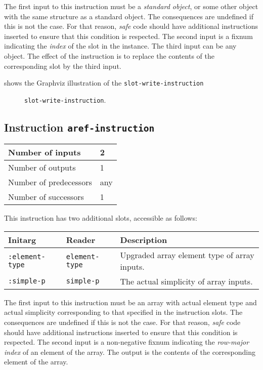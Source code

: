 The first input to this instruction must be a \emph{standard object},
or some other object with the same structure as a standard object.
The consequences are undefined if this is not the case.  For that
reason, \emph{safe} code should have additional instructions inserted
to ensure that this condition is respected.  The second input is a
fixnum indicating the \emph{index} of the slot in the instance.  The
third input can be any object.  The effect of the instruction is to
replace the contents of the corresponding slot by the third input.

 shows the Graphviz illustration of the
\texttt{slot-write-instruction}

\begin{figure}
\begin{center}
\end{center}
\caption{\label{fig-slot-write-instruction}
\texttt{slot-write-instruction}.}
\end{figure}

\subsection{Instruction \texttt{aref-instruction}}
\label{mir-instruction-aref}

\begin{tabular}{|l|l|}
\hline
Number of inputs & 2\\
\hline
Number of outputs & 1\\
\hline
Number of predecessors & any\\
\hline
Number of successors & 1\\
\hline
\end{tabular}

This instruction has two additional slots, accessible as follows:

\begin{tabular}{|l|l|l|}
  \hline
  Initarg & Reader & Description\\
  \hline\hline
  \texttt{:element-type} & \texttt{element-type} & Upgraded array element type of array inputs.\\
  \hline
  \texttt{:simple-p} & \texttt{simple-p} & The actual simplicity of array inputs.\\
  \hline
\end{tabular}

The first input to this instruction must be an array with actual
element type and actual simplicity corresponding to that specified in
the instruction slots. The consequences are undefined if this is not
the case.  For that reason, \emph{safe} code should have additional
instructions inserted to ensure that this condition is respected.  The
second input is a non-negative fixnum indicating the \emph{row-major
  index} of an element of the array.  The output is the contents of
the corresponding element of the array.

